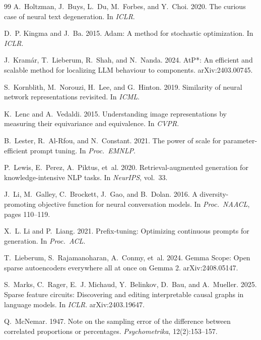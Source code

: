 \documentclass[11pt,twocolumn]{article}
\begin{document}
\begin{thebibliography}{99}
 A.~Holtzman, J.~Buys, L.~Du, M.~Forbes, and Y.~Choi. 2020. The curious case of neural text degeneration. In \textit{ICLR}.

 D.~P. Kingma and J.~Ba. 2015. Adam: A method for stochastic optimization. In \textit{ICLR}.

 J.~Kram\'ar, T.~Lieberum, R.~Shah, and N.~Nanda. 2024. AtP*: An efficient and scalable method for localizing LLM behaviour to components. arXiv:2403.00745.

 S.~Kornblith, M.~Norouzi, H.~Lee, and G.~Hinton. 2019. Similarity of neural network representations revisited. In \textit{ICML}.

 K.~Lenc and A.~Vedaldi. 2015. Understanding image representations by measuring their equivariance and equivalence. In \textit{CVPR}.

 B.~Lester, R.~Al-Rfou, and N.~Constant. 2021. The power of scale for parameter-efficient prompt tuning. In \textit{Proc.\ EMNLP}.

 P.~Lewis, E.~Perez, A.~Piktus, et~al. 2020. Retrieval-augmented generation for knowledge-intensive NLP tasks. In \textit{NeurIPS}, vol.~33.

 J.~Li, M.~Galley, C.~Brockett, J.~Gao, and B.~Dolan. 2016. A diversity-promoting objective function for neural conversation models. In \textit{Proc.\ NAACL}, pages 110--119.

 X.~L. Li and P.~Liang. 2021. Prefix-tuning: Optimizing continuous prompts for generation. In \textit{Proc.\ ACL}.

 T.~Lieberum, S.~Rajamanoharan, A.~Conmy, et~al. 2024. Gemma Scope: Open sparse autoencoders everywhere all at once on Gemma 2. arXiv:2408.05147.

 S.~Marks, C.~Rager, E.~J. Michaud, Y.~Belinkov, D.~Bau, and A.~Mueller. 2025. Sparse feature circuits: Discovering and editing interpretable causal graphs in language models. In \textit{ICLR}. arXiv:2403.19647.

 Q.~McNemar. 1947. Note on the sampling error of the difference between correlated proportions or percentages. \textit{Psychometrika}, 12(2):153--157.


\end{thebibliography}
\end{document}
